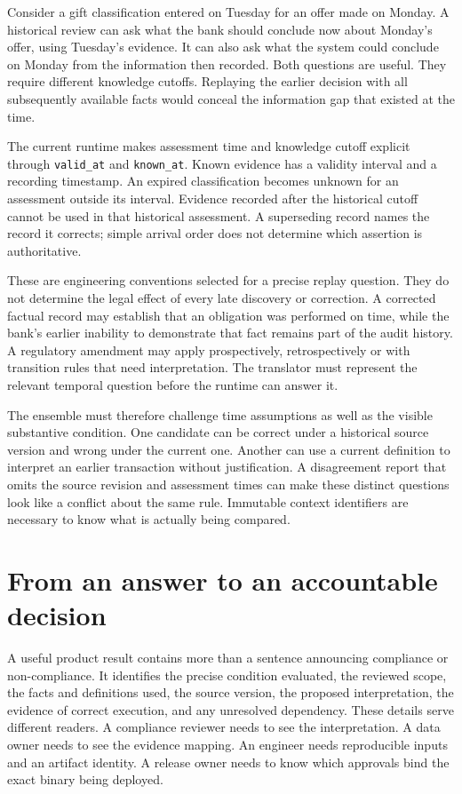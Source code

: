Consider a gift classification entered on Tuesday for an offer made on Monday.
A historical review can ask what the bank should conclude now about Monday's
offer, using Tuesday's evidence. It can also ask what the system could conclude
on Monday from the information then recorded. Both questions are useful. They
require different knowledge cutoffs. Replaying the earlier decision with all
subsequently available facts would conceal the information gap that existed at
the time.

The current runtime makes assessment time and knowledge cutoff explicit through
\texttt{valid\_at} and \texttt{known\_at}. Known evidence has a validity interval
and a recording timestamp. An expired classification becomes unknown for an
assessment outside its interval. Evidence recorded after the historical cutoff
cannot be used in that historical assessment. A superseding record names the
record it corrects; simple arrival order does not determine which assertion is
authoritative.

These are engineering conventions selected for a precise replay question. They
do not determine the legal effect of every late discovery or correction. A
corrected factual record may establish that an obligation was performed on time,
while the bank's earlier inability to demonstrate that fact remains part of the
audit history. A regulatory amendment may apply prospectively, retrospectively or
with transition rules that need interpretation. The translator must represent
the relevant temporal question before the runtime can answer it.

The ensemble must therefore challenge time assumptions as well as the visible
substantive condition. One candidate can be correct under a historical source
version and wrong under the current one. Another can use a current definition
to interpret an earlier transaction without justification. A disagreement report
that omits the source revision and assessment times can make these distinct
questions look like a conflict about the same rule. Immutable context identifiers
are necessary to know what is actually being compared.

\section{From an answer to an accountable decision}
\label{sec:problem-accountability}
A useful product result contains more than a sentence announcing compliance or
non-compliance. It identifies the precise condition evaluated, the reviewed scope,
the facts and definitions used, the source version, the proposed interpretation,
the evidence of correct execution, and any unresolved dependency. These details
serve different readers. A compliance reviewer needs to see the interpretation.
A data owner needs to see the evidence mapping. An engineer needs reproducible
inputs and an artifact identity. A release owner needs to know which approvals
bind the exact binary being deployed.


